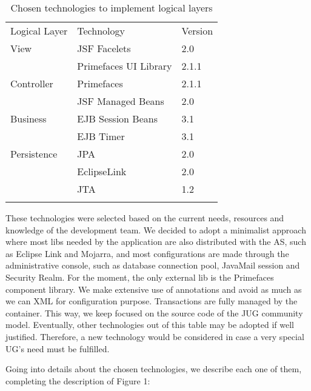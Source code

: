 \documentclass[envcountsame,envcountchap]{svmono}
\begin{document}
\begin{table}
\centering
\caption{Chosen technologies to implement logical layers}
\label{tab:chosen-technologies}
\begin{tabular}{lll}
\hline\noalign{\smallskip}
Logical Layer & Technology & Version \\
\noalign{\smallskip}\hline\noalign{\smallskip}
View & JSF Facelets & 2.0 \\
 & Primefaces UI Library & 2.1.1 \\
\noalign{\smallskip}
Controller & Primefaces & 2.1.1 \\
 & JSF Managed Beans & 2.0 \\
\noalign{\smallskip}
Business & EJB Session Beans & 3.1 \\
 & EJB Timer & 3.1 \\
\noalign{\smallskip}
Persistence & JPA & 2.0 \\
 & EclipseLink & 2.0 \\
 & JTA & 1.2 \\
\noalign{\smallskip}\hline
\end{tabular}
\end{table}

These technologies were selected based on the current needs, resources and knowledge of the development team. We decided to adopt a minimalist approach where most libs needed by the application are also distributed with the AS, such as Eclipse Link and Mojarra, and most configurations are made through the administrative console, such as database connection pool, JavaMail session and Security Realm. For the moment, the only external lib is the Primefaces component library. We make extensive use of annotations and avoid as much as we can XML for configuration purpose. Transactions are fully managed by the container. This way, we keep focused on the source code of the JUG community model. Eventually, other technologies out of this table may be adopted if well justified. Therefore, a new technology would be considered in case a very special UG's need must be fulfilled.

Going into details about the chosen technologies, we describe each one of them, completing the description of Figure 1:
\end{document}

